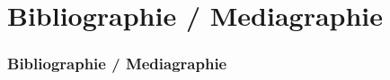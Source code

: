 \documentclass{beamer}
\begin{document}
\def\sectionPartBibliographie{Bibliographie / Mediagraphie}
\section{\sectionPartBibliographie}
\begin{frame}
	\frametitle{\sectionPartBibliographie}
	\nocite{*}
	
	
\end{frame}
\end{document}
